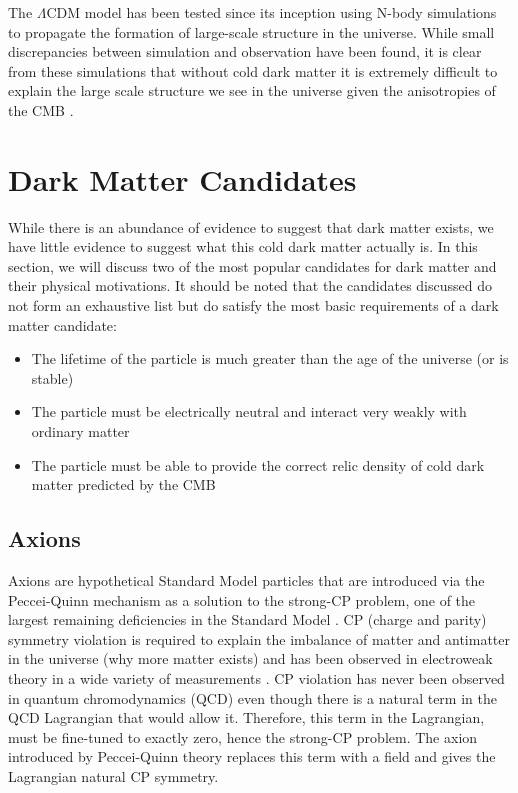 The $\Lambda$CDM model has been tested since its inception using N-body simulations to propagate the formation of large-scale structure in the universe.  While small discrepancies between simulation and observation have been found, it is clear from these simulations that without cold dark matter it is extremely difficult to explain the large scale structure we see in the universe given the anisotropies of the CMB \cite{navarro1996structure, springel2006large, vogelsberger2014introducing}.



\section{Dark Matter Candidates}
\label{sec:dm_candidates}

While there is an abundance of evidence to suggest that dark matter exists, we have little evidence to suggest what this cold dark matter actually is.  In this section, we will discuss two of the most popular candidates for dark matter and their physical motivations.  It should be noted that the candidates discussed do not form an exhaustive list but do satisfy the most basic requirements of a dark matter candidate:

\begin{itemize}
        \item The lifetime of the particle is much greater than the age of the universe (or is stable)
        \item  The particle must be electrically neutral and interact very weakly with ordinary matter
        \item The particle must be able to provide the correct relic density of cold dark matter predicted by the CMB
\end{itemize}


\subsection{Axions}



Axions are hypothetical Standard Model particles that are introduced via the Peccei-Quinn mechanism as a solution to the strong-CP problem, one of the largest remaining deficiencies in the Standard Model \cite{axion_1977}.  CP (charge and parity) symmetry violation is required to explain the imbalance of matter and antimatter in the universe (why more matter exists) and has been observed in electroweak theory in a wide variety of measurements \cite{alavi1999observation, fanti1999new, aubert2001measurement, abe2001observation, aaij2013first}.  CP violation has never been observed in quantum chromodynamics (QCD) even though there is a natural term in the QCD Lagrangian that would allow it.  Therefore, this term in the Lagrangian, must be fine-tuned to exactly zero, hence the strong-CP problem.  The axion introduced by Peccei-Quinn theory replaces this term with a field and gives the Lagrangian natural CP symmetry.

